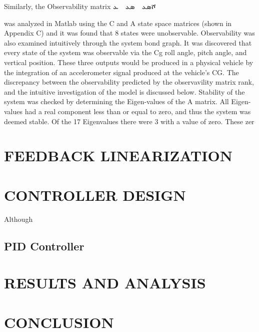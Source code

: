 \documentclass[10pt,twocolumn]{witseiepaper}
\begin{document}
Similarly, the Observability matrix 
ܣܥ  ܣܥ  ܥሾ

was analyzed in Matlab using the C and A state space 
matrices (shown in Appendix C) and it was found 
that 8 states were unobservable. Observability was 
also examined intuitively through the system bond 
graph. It was discovered that every state of the 
system was observable via the Cg roll angle, pitch 
angle, and vertical position. These three outputs 
would be produced in a physical vehicle by the 
integration of an accelerometer signal produced at the 
vehicle’s CG. The discrepancy between the 
observability predicted by the observavility matrix 
rank, and the intuitive investigation of the model is 
discussed below. 
Stability of the system was checked by determining 
the Eigen-values of the A matrix. All Eigen-values 
had a real component less than or equal to zero, and 
thus the system was deemed stable. Of the 17 Eigenvalues there were 3 with a value of zero. These zer
\section{FEEDBACK LINEARIZATION}


\section{CONTROLLER DESIGN}
Although 




\subsection{PID Controller}


\section{RESULTS AND ANALYSIS}

\section{CONCLUSION}










\end{document}
